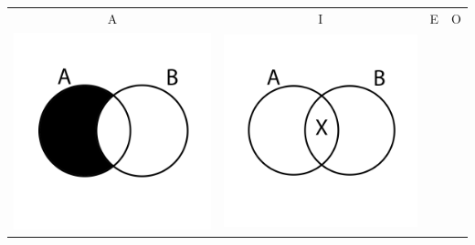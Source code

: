 \documentclass[12pt,a4paper]{report}
\begin{document}
\begin{table}[h!]
  \centering
  \begin{tabular}{  c  c  c  c }
    A & I & E & O\\
    \begin{minipage}{.22\textwidth}
      \includegraphics[width=\linewidth]{AVenn}
    \end{minipage}
    &
    \begin{minipage}{.22\textwidth}
      \includegraphics[width=\linewidth]{IVenn}

\end{minipage}
\end{tabular}
\end{table}
\end{document}
